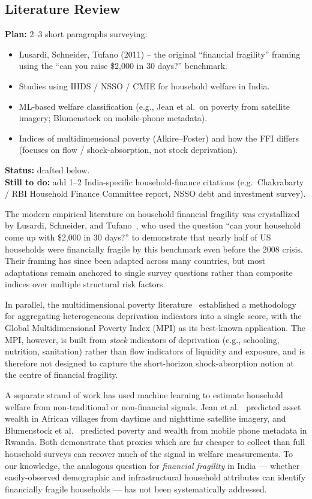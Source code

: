 \documentclass[colorlinks,balance]{asmeconf}
\begin{document}
\subsection{Literature Review}
\begin{outline}
\textbf{Plan:} 2--3 short paragraphs surveying:
\begin{itemize}
\item Lusardi, Schneider, Tufano (2011) -- the original ``financial fragility'' framing using the ``can you raise \$2{,}000 in 30 days?'' benchmark.
\item Studies using IHDS / NSSO / CMIE for household welfare in India.
\item ML-based welfare classification (e.g., Jean et al.\ on poverty from satellite imagery; Blumenstock on mobile-phone metadata).
\item Indices of multidimensional poverty (Alkire--Foster) and how the FFI differs (focuses on flow / shock-absorption, not stock deprivation).
\end{itemize}
\textbf{Status:} drafted below.\\
\textbf{Still to do:} add 1--2 India-specific household-finance citations (e.g.\ Chakrabarty / RBI Household Finance Committee report, NSSO debt and investment survey).
\end{outline}
The modern empirical literature on household financial fragility was crystallized by Lusardi, Schneider, and Tufano~\cite{lusardi2011fragility}, who used the question ``can your household come up with \$2{,}000 in 30 days?'' to demonstrate that nearly half of US households were financially fragile by this benchmark even before the 2008 crisis. Their framing has since been adapted across many countries, but most adaptations remain anchored to single survey questions rather than composite indices over multiple structural risk factors.

In parallel, the multidimensional poverty literature~\cite{alkire2011counting} established a methodology for aggregating heterogeneous deprivation indicators into a single score, with the Global Multidimensional Poverty Index (MPI) as its best-known application. The MPI, however, is built from \emph{stock} indicators of deprivation (e.g., schooling, nutrition, sanitation) rather than flow indicators of liquidity and exposure, and is therefore not designed to capture the short-horizon shock-absorption notion at the centre of financial fragility.

A separate strand of work has used machine learning to estimate household welfare from non-traditional or non-financial signals. Jean et al.~\cite{jean2016poverty} predicted asset wealth in African villages from daytime and nighttime satellite imagery, and Blumenstock et al.~\cite{blumenstock2015predicting} predicted poverty and wealth from mobile phone metadata in Rwanda. Both demonstrate that proxies which are far cheaper to collect than full household surveys can recover much of the signal in welfare measurements. To our knowledge, the analogous question for \emph{financial fragility} in India --- whether easily-observed demographic and infrastructural household attributes can identify financially fragile households --- has not been systematically addressed.
\end{document}
